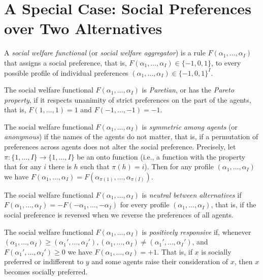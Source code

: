 \addtocounter{section}{1}


\section{A Special Case: Social Preferences over Two Alternatives}

\begin{defn}
    A \emph{social welfare functional} (or \emph{social welfare aggregator}) is a rule $F(\alpha_1, \dots, \alpha_I)$ that assigns a social preference, that is, $F(\alpha_1, \dots, \alpha_I) \in \{-1, 0, 1\}$, to every possible profile of individual preferences $(\alpha_1, \dots, \alpha_I) \in \{-1, 0, 1\}^I$.
\end{defn}

\begin{defn}
    The social welfare functional $F(\alpha_1, \dots, \alpha_I)$ is \emph{Paretian}, or has the \emph{Pareto property}, if it respects unanimity of strict preferences on the part of the agents, that is, $F(1, \dots, 1) = 1$ and $F(-1, \dots, -1) = -1$.
\end{defn}

\begin{defn}
    The social welfare functional $F(\alpha_1, \dots, \alpha_I)$ is \emph{symmetric among agents} (or \emph{anonymous}) if the names of the agents do not matter, that is, if a permutation of preferences across agents does not alter the social preference. Precisely, let $\pi : \{1, \dots, I\} \to \{1, \dots, I\}$ be an onto function (i.e., a function with the property that for any $i$ there is $h$ such that $\pi (h) = i$). Then for any profile $(\alpha_1, \dots, \alpha_I)$ we have $F(\alpha_1, \dots, \alpha_I) = F(\alpha_{\pi(1)}, \dots, \alpha_{\pi(I)})$.
\end{defn}

\begin{defn}
    The social welfare functional $F(\alpha_1, \dots, \alpha_I)$ is \emph{neutral between alternatives} if $F(\alpha_1, \dots, \alpha_I) = - F(-\alpha_1, \dots, -\alpha_I)$ for every profile $(\alpha_1, \dots, \alpha_I)$, that is, if the social preference is reversed when we reverse the preferences of all agents.
\end{defn}

\begin{defn}
    The social welfare functional $F(\alpha_1, \dots, \alpha_I)$ is \emph{positively responsive} if, whenever $(\alpha_1, \dots, \alpha_I) \geq (\alpha_1', \dots, \alpha_I'), (\alpha_1, \dots, \alpha_I) \neq (\alpha_1', \dots, \alpha_I')$, and $F(\alpha_1', \dots, \alpha_I') \geq 0$ we have $F(\alpha_1, \dots, \alpha_I) = +1$. That is, if $x$ is socially preferred or indifferent to $y$ and some agents raise their consideration of $x$, then $x$ becomes socially preferred.
\end{defn}

